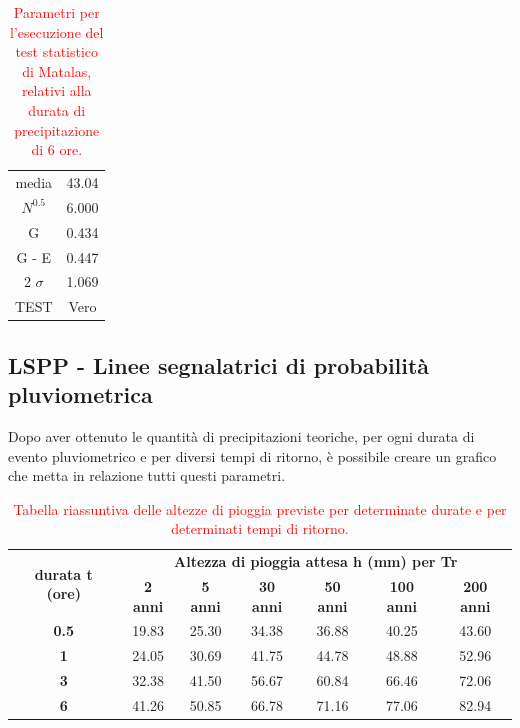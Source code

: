 \begin{table}[H] \centering
    \caption{\textcolor{red}{Parametri per l'esecuzione del test statistico di Matalas, relativi alla durata di precipitazione di 6 ore.}}
    \begin{tabular}{cc}
    \toprule
    media                  & 43.04 \\
    $N ^{0.5}$             &  6.000\\
    G                      & 0.434 \\
    G - E                  &  0.447\\
    2 $\sigma$             & 1.069 \\
    TEST                   & Vero \\
    \bottomrule
    \end{tabular}
\end{table}

\subsection{LSPP - Linee segnalatrici di probabilità pluviometrica}
Dopo aver ottenuto le quantità di precipitazioni teoriche, per ogni durata di evento pluviometrico e per diversi tempi di ritorno, è possibile creare un grafico che metta in relazione tutti questi parametri.

\begin{table}[H]\centering
    \caption{\textcolor{red}{Tabella riassuntiva delle altezze di pioggia previste per determinate durate e per determinati tempi di ritorno.}}
    \begin{tabular}{ccccccc}
    \toprule
    \multirow{2}{*}{\textbf{durata t (ore)}} & \multicolumn{6}{c}{\textbf{Altezza di pioggia attesa h (mm) per Tr}} \\
  & \textbf{2 anni} & \textbf{5 anni} & \textbf{30 anni} & \textbf{50 anni} & \textbf{100 anni} & \textbf{200 anni} \\
    \textbf{0.5}                             & 19.83           & 25.30           & 34.38            & 36.88            & 40.25             & 43.60             \\
    \textbf{1}                               & 24.05           & 30.69           & 41.75            & 44.78            & 48.88             & 52.96             \\
    \textbf{3}                               & 32.38           & 41.50           & 56.67            & 60.84            & 66.46             & 72.06             \\
    \textbf{6}                               & 41.26           & 50.85           & 66.78            & 71.16            & 77.06             & 82.94            \\
    \bottomrule
    \end{tabular}
    \label{altezze_critiche_pioggia}
    \end{table}

